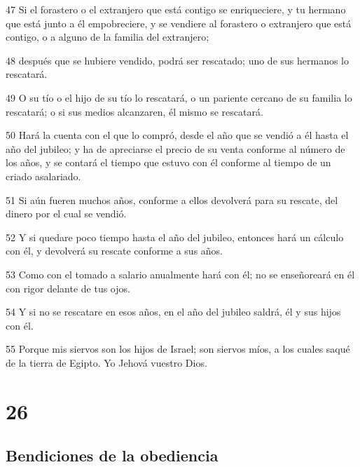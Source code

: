 \par 47 Si el forastero o el extranjero que está contigo se enriqueciere, y tu hermano que está junto a él empobreciere, y se vendiere al forastero o extranjero que está contigo, o a alguno de la familia del extranjero;
\par 48 después que se hubiere vendido, podrá ser rescatado; uno de sus hermanos lo rescatará.
\par 49 O su tío o el hijo de su tío lo rescatará, o un pariente cercano de su familia lo rescatará; o si sus medios alcanzaren, él mismo se rescatará.
\par 50 Hará la cuenta con el que lo compró, desde el año que se vendió a él hasta el año del jubileo; y ha de apreciarse el precio de su venta conforme al número de los años, y se contará el tiempo que estuvo con él conforme al tiempo de un criado asalariado.
\par 51 Si aún fueren muchos años, conforme a ellos devolverá para su rescate, del dinero por el cual se vendió.
\par 52 Y si quedare poco tiempo hasta el año del jubileo, entonces hará un cálculo con él, y devolverá su rescate conforme a sus años.
\par 53 Como con el tomado a salario anualmente hará con él; no se enseñoreará en él con rigor delante de tus ojos.
\par 54 Y si no se rescatare en esos años, en el año del jubileo saldrá, él y sus hijos con él.
\par 55 Porque mis siervos son los hijos de Israel; son siervos míos, a los cuales saqué de la tierra de Egipto. Yo Jehová vuestro Dios.

\chapter{26}

\section*{Bendiciones de la obediencia}

